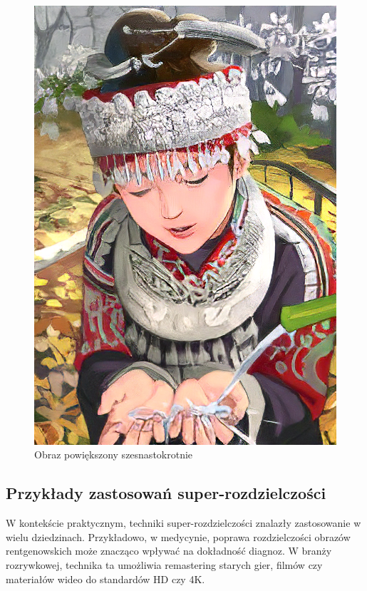 \begin{figure}[ht]
\begin{minipage}[t]{0.3\linewidth}
        \includegraphics[width=\linewidth]{Rozdziały/02.Podstawy_teoretyczne/Obrazy/comic_ESRGAN_x16.png}
        \caption{Obraz powiększony szesnastokrotnie}
        \label{fig:image3}
    \end{minipage}
\end{figure}

\subsection*{Przykłady zastosowań super-rozdzielczości}

W kontekście praktycznym, techniki super-rozdzielczości znalazły zastosowanie w wielu dziedzinach. Przykładowo, w medycynie, poprawa rozdzielczości obrazów rentgenowskich może znacząco wpływać na dokładność diagnoz. W branży rozrywkowej, technika ta umożliwia remastering starych gier, filmów czy materiałów wideo do standardów HD czy 4K.

